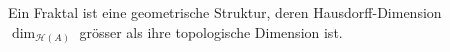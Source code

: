 \begin{definition}
    Ein Fraktal ist eine geometrische Struktur, deren Hausdorff-Dimension $\dim_{\mathcal{H}(A)}$ grösser als ihre topologische Dimension ist.
\end{definition}